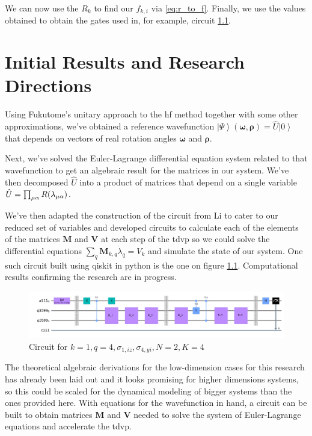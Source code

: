 \documentclass{aux/ttuthes2007}
\newcommand{\ket}[1]{\ensuremath{\left|#1\right\rangle}}
\newcommand{\elec}{N}
\newcommand{\orb}{K}
\newcommand{\ind}[1]{{\uo #1 \oo #1}}
\newcommand{\uo}[1]{
		\IfEqCase{#1}{
			{0}{\mu}
			{1}{\nu}
			{2}{\xi}
		}[\PackageError{uo}{Undefined option to uo: #1}{}]
}
\newcommand{\oo}[1]{
		\IfEqCase{#1}{
			{0}{\alpha}
			{1}{\beta}
			{2}{\gamma}
		}[\PackageError{unocorb}{Undefined option to unuo: #1}{}]
}
\begin{document}
We can now use the $R_k$ to find our $f_{k, i}$ via \ref{eq:r_to_f}. Finally, we use the values obtained to obtain the gates used in, for example, circuit \ref{fig:circuit}.


\chapter{\textbf{Initial Results and Research Directions}}\label{chap:results}

Using Fukutome's  unitary approach to the \gls{hf} method together with some other approximations, we've obtained a reference wavefunction $\ket \Psi(\bm \omega, \bm \rho) = \hat U\ket 0$ that depends on vectors of real rotation angles $\bm \omega$ and $\bm \rho$.

Next, we've solved the Euler-Lagrange differential equation system related to that wavefunction to get an algebraic result for the matrices in our system.
We've then decomposed $\hat U$ into a product of matrices that depend on a single variable $\hat U = \prod_{\ind 0} R(\lambda_{\ind 0})$.

We've then adapted the construction of the circuit from Li  to cater to our reduced set of variables and developed circuits to calculate each of the elements of the matrices $\bm M$ and $\bm V$ at each step of the \gls{tdvp} so we could solve the differential equations $\sum_q \bm M_{k,q}\dot{\lambda}_q = V_k$ and simulate the state of our system. One such circuit built using qiskit in python is the one on figure \ref{fig:circuit}. Computational results confirming the research are in progress.
\begin{figure}[hb!]
  \includegraphics[width=\linewidth]{img/circuit.jpg}
  \caption{Circuit for $k = 1, q = 4, \sigma_{1, iz}, \sigma_{4, yi}, \elec = 2, \orb = 4$}
  \label{fig:circuit}
\end{figure}

The theoretical algebraic derivations for the low-dimension cases for this research has already been laid out and it looks promising for higher dimensions systems, so this could be scaled for the dynamical modeling of bigger systems than the ones provided here.
With equations for the wavefunction in hand, a circuit can be built to obtain matrices $\bm M$ and $\bm V$ needed to solve the system of Euler-Lagrange equations and accelerate the \gls{tdvp}.
\end{document}
